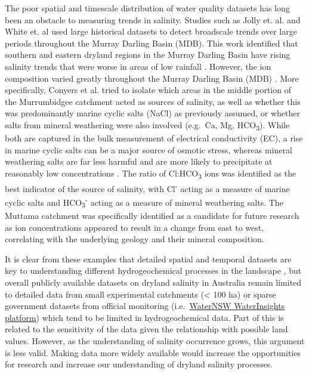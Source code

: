 \documentclass[, manuscript]{copernicus}
\begin{document}
The poor spatial and timescale distribution of water quality datasets
has long been an obstacle to measuring trends in salinity. Studies such
as Jolly et. al. \citeyearpar{Jolly2001} and White et. al
\citeyearpar{White2009} used large historical datasets to detect
broadscale trends over large periods throughout the Murray Darling Basin
(MDB). This work identified that southern and eastern dryland regions in
the Murray Darling Basin have rising salinity trends that were worse in
areas of low rainfall \citep{White2009, Jolly2001}. However, the ion
composition varied greatly throughout the Murray Darling Basin (MDB)
\citep{White2009}. More specifically, Conyers et al.
\citeyearpar{Conyers2008} tried to isolate which areas in the middle
portion of the Murrumbidgee catchment acted as sources of salinity, as
well as whether this was predominantly marine cyclic salts (NaCl) as
previously assumed, or whether salts from mineral weathering were also
involved (e.g.~Ca, Mg, HCO\textsubscript{3}). While both are captured in
the bulk measurement of electrical conductivity (EC), a rise in marine
cyclic salts can be a major source of osmotic stress, whereas mineral
weathering salts are far less harmful and are more likely to precipitate
at reasonably low concentrations \citep{Conyers2008}. The ratio of
Cl:HCO\textsubscript{3} ions was identified as the best indicator of the
source of salinity, with Cl\textsuperscript{-} acting as a measure of
marine cyclic salts and HCO\textsubscript{3}\textsuperscript{-} acting
as a measure of mineral weathering salts. The Muttama catchment was
specifically identified as a candidate for future research as ion
concentrations appeared to result in a change from east to west,
correlating with the underlying geology and their mineral composition.

It is clear from these examples that detailed spatial and temporal
datasets are key to understanding different hydrogeochemical processes
in the landscape \citep[e.g.][]{Cartwright2010, Dalhaus2010}, but
overall publicly available datasets on dryland salinity in Australia
remain limited to detailed data from small experimental catchments
(\textless{} 100 ha) \citep{Summerell2006, Hughes2007} or sparse
government datasets from official monitoring
(i.e.~\href{https://waterinsights.waternsw.com.au/}{WaterNSW
WaterInsights platform}) which tend to be limited in hydrogeochemical
data. Part of this is related to the sensitivity of the data given the
relationship with possible land values. However, as the understanding of
salinity occurrence grows, this argument is less valid. Making data more
widely available would increase the opportunities for research and
increase our understanding of dryland salinity processes.
\end{document}
